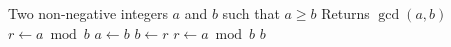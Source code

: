 \documentclass{article}
\begin{document}
\begin{algorithm}
\caption{Euclid's Algorithm for GCD}
\begin{algorithmic}[1]
\Require Two non-negative integers $a$ and $b$ such that $a \ge b$
\Ensure Returns $\gcd(a,b)$
\State $r \gets a \bmod b$
    \State $a \gets b$
    \State $b \gets r$
    \State $r \gets a \bmod b$
\EndWhile
\State \Return $b$
\end{algorithmic}
\end{algorithm}
\end{document}
